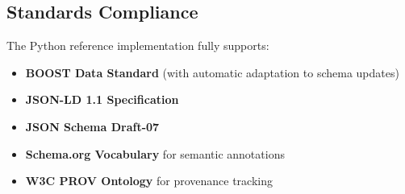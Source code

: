 \subsection{Standards Compliance}
\label{sec:python-standards}

The Python reference implementation fully supports:

\begin{itemize}
    \item \textbf{BOOST Data Standard} (with automatic adaptation to schema updates)
    \item \textbf{JSON-LD 1.1 Specification}
    \item \textbf{JSON Schema Draft-07}
    \item \textbf{Schema.org Vocabulary} for semantic annotations
    \item \textbf{W3C PROV Ontology} for provenance tracking
\end{itemize}